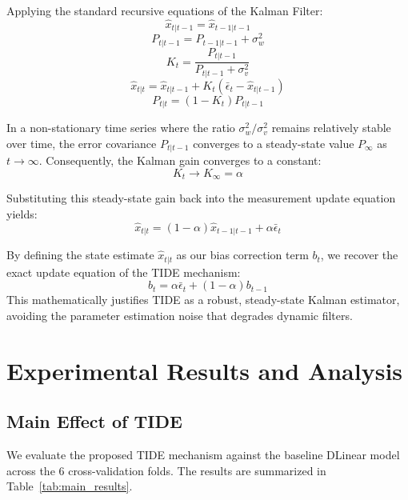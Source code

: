 \documentclass[journal]{IEEEtran}
\begin{document}
Applying the standard recursive equations of the Kalman Filter:
\begin{equation}
\hat{x}_{t|t-1} = \hat{x}_{t-1|t-1}
\end{equation}
\begin{equation}
P_{t|t-1} = P_{t-1|t-1} + \sigma_w^2
\end{equation}
\begin{equation}
K_t = \frac{P_{t|t-1}}{P_{t|t-1} + \sigma_v^2}
\end{equation}
\begin{equation}
\hat{x}_{t|t} = \hat{x}_{t|t-1} + K_t \left( \bar{\epsilon}_t - \hat{x}_{t|t-1} \right)
\end{equation}
\begin{equation}
P_{t|t} = (1 - K_t) P_{t|t-1}
\end{equation}

In a non-stationary time series where the ratio $\sigma_w^2 / \sigma_v^2$ remains relatively stable over time, the error covariance $P_{t|t-1}$ converges to a steady-state value $P_{\infty}$ as $t \to \infty$. Consequently, the Kalman gain converges to a constant:
\begin{equation}
K_t \to K_{\infty} = \alpha
\end{equation}

Substituting this steady-state gain back into the measurement update equation yields:
\begin{equation}
\hat{x}_{t|t} = (1 - \alpha) \hat{x}_{t-1|t-1} + \alpha \bar{\epsilon}_t
\end{equation}

By defining the state estimate $\hat{x}_{t|t}$ as our bias correction term $b_t$, we recover the exact update equation of the TIDE mechanism:
\begin{equation}
b_t = \alpha \bar{\epsilon}_t + (1 - \alpha) b_{t-1}
\end{equation}
This mathematically justifies TIDE as a robust, steady-state Kalman estimator, avoiding the parameter estimation noise that degrades dynamic filters.

\section{Experimental Results and Analysis}

\subsection{Main Effect of TIDE}
We evaluate the proposed TIDE mechanism against the baseline DLinear model across the 6 cross-validation folds. The results are summarized in Table~\ref{tab:main_results}.
\end{document}
